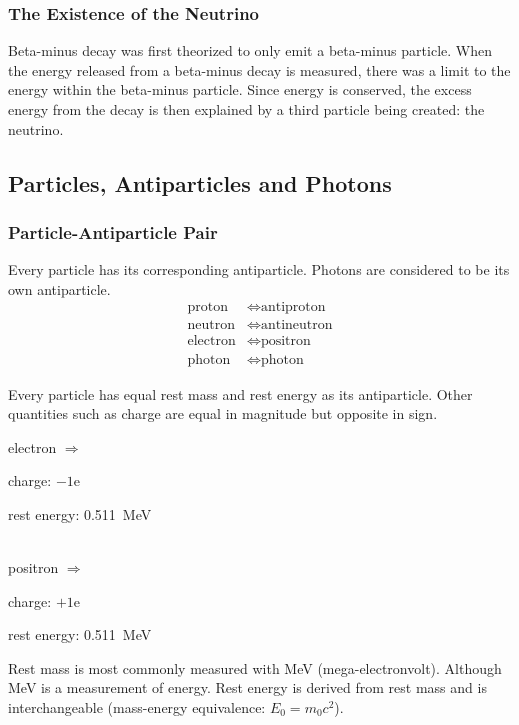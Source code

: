 \documentclass[10pt]{article}
\begin{document}
\begin{multicols}{2}
	\subsubsection{The Existence of the Neutrino}
	Beta-minus decay was first theorized to only emit a beta-minus particle. When
	the energy released from a beta-minus decay is measured, there was a limit to
	the energy within the beta-minus particle. Since energy is conserved, the excess
	energy from the decay is then explained by a third particle being created: the
	neutrino.

	\subsection{Particles, Antiparticles and Photons}
	\subsubsection{Particle-Antiparticle Pair}
	Every particle has its corresponding antiparticle. Photons are considered to be
	its own antiparticle.
	\begin{align*}
		\text{proton}   & \Leftrightarrow \text{antiproton}
		\\
		\text{neutron}  & \Leftrightarrow \text{antineutron}
		\\
		\text{electron} & \Leftrightarrow \text{positron}
		\\
		\text{photon}   & \Leftrightarrow  \text{photon}
	\end{align*}

	Every particle has equal rest mass and rest energy as its antiparticle. Other quantities such as charge are equal in magnitude but opposite in sign.
	\begin{center}
		electron $\Rightarrow$ \begin{varwidth}{0.5\linewidth}
			charge: $-1$e \par
			rest energy: \qty{0.511}{\mega\electronvolt}
		\end{varwidth}
		\\[\medskipamount]
		positron $\Rightarrow$ \begin{varwidth}{0.5\linewidth}
			charge: $+1$e \par
			rest energy: \qty{0.511}{\mega\electronvolt}
		\end{varwidth}
	\end{center}
	Rest mass is most commonly measured with MeV (mega-electronvolt). Although MeV
	is a measurement of energy. Rest energy is derived from rest mass and is
	interchangeable (mass-energy equivalence: $E_0=m_0c^2$).


\end{multicols}
\end{document}
